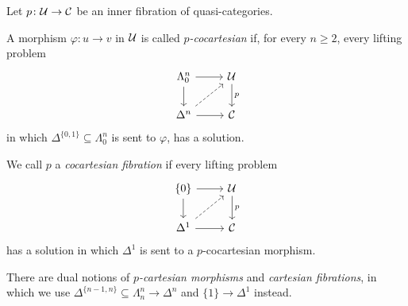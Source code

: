 \begin{defi}\label{def:Cocartesian}
	Let $p\colon \mathcal{U}\rightarrow\mathcal{C}$ be an inner fibration of quasi-categories.
	\begin{alphanumerate}
		\item A morphism $\varphi\colon u\rightarrow v$ in $\mathcal{U}$ is called \emph{$p$-cocartesian} if, for every $n\geqslant 2$, every lifting problem\label{enum:CocartesianMorphism}
		\begin{equation*}
			\begin{tikzcd}
				\Lambda_0^n\rar\dar & \Uu\dar["p"]\\
				\Delta^n\urar[dashed]\rar & \Cc
			\end{tikzcd}
		\end{equation*}
		in which $\Delta^{\{0,1\}}\subseteq \Lambda_0^n$ is sent to $\varphi$, has a solution.
		\item We call $p$ a \emph{cocartesian fibration} if every lifting problem\label{enum:CocartesianFibration}
		\begin{equation*}
			\begin{tikzcd}
				\{0\}\rar\dar & \Uu\dar["p"]\\
				\Delta^1\urar[dashed]\rar & \Cc
			\end{tikzcd}
		\end{equation*}
		has a solution in which $\Delta^1$ is sent to a $p$-cocartesian morphism.
	\end{alphanumerate}
	There are dual notions of \emph{$p$-cartesian morphisms} and \emph{cartesian fibrations}, in which we use $\Delta^{\{n-1,n\}}\subseteq \Lambda_n^n\rightarrow \Delta^n$ and $\{1\}\rightarrow \Delta^1$ instead.
\end{defi}


